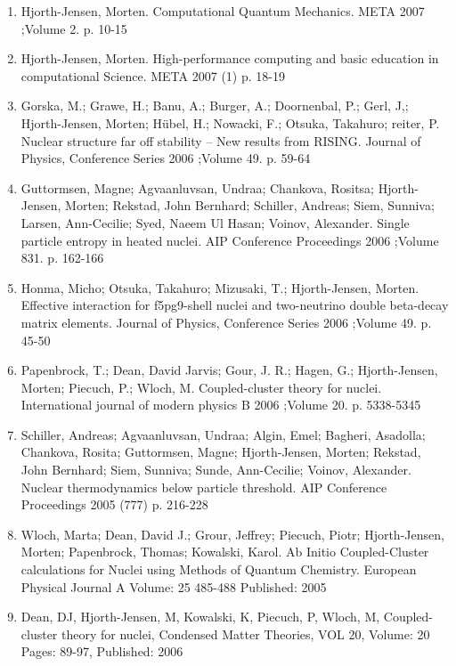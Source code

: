 \documentclass[%
oneside,                 %
final,                   %
10pt]{article}
\begin{document}
\begin{enumerate}
\item Hjorth-Jensen, Morten.  Computational Quantum Mechanics. META 2007 ;Volume 2. p. 10-15

\item Hjorth-Jensen, Morten.  High-performance computing and basic education in computational Science. META 2007 (1) p. 18-19

\item Gorska, M.; Grawe, H.; Banu, A.; Burger, A.; Doornenbal, P.; Gerl, J,; Hjorth-Jensen, Morten; Hübel, H.; Nowacki, F.; Otsuka, Takahuro; reiter, P.  Nuclear structure far off stability – New results from RISING. Journal of Physics, Conference Series 2006 ;Volume 49. p. 59-64

\item Guttormsen, Magne; Agvaanluvsan, Undraa; Chankova, Rositsa; Hjorth-Jensen, Morten; Rekstad, John Bernhard; Schiller, Andreas; Siem, Sunniva; Larsen, Ann-Cecilie; Syed, Naeem Ul Hasan; Voinov, Alexander.  Single particle entropy in heated nuclei. AIP Conference Proceedings 2006 ;Volume 831. p. 162-166

\item Honma, Micho; Otsuka, Takahuro; Mizusaki, T.; Hjorth-Jensen, Morten.  Effective interaction for f5pg9-shell nuclei and two-neutrino double beta-decay matrix elements. Journal of Physics, Conference Series 2006 ;Volume 49. p. 45-50

\item Papenbrock, T.; Dean, David Jarvis; Gour, J. R.; Hagen, G.; Hjorth-Jensen, Morten; Piecuch, P.; Wloch, M.  Coupled-cluster theory for nuclei. International journal of modern physics B 2006 ;Volume 20. p. 5338-5345

\item Schiller, Andreas; Agvaanluvsan, Undraa; Algin, Emel; Bagheri, Asadolla; Chankova, Rosita; Guttormsen, Magne; Hjorth-Jensen, Morten; Rekstad, John Bernhard; Siem, Sunniva; Sunde, Ann-Cecilie; Voinov, Alexander.  Nuclear thermodynamics below particle threshold. AIP Conference Proceedings 2005 (777) p. 216-228

\item Wloch, Marta; Dean, David J.; Grour, Jeffrey; Piecuch, Piotr; Hjorth-Jensen, Morten; Papenbrock, Thomas; Kowalski, Karol.  Ab Initio Coupled-Cluster calculations for Nuclei using Methods of Quantum Chemistry. European Physical Journal A  Volume: 25  485-488   Published: 2005

\item Dean, DJ, Hjorth-Jensen, M, Kowalski, K, Piecuch, P, Wloch, M, Coupled-cluster theory for nuclei, Condensed Matter Theories, VOL 20, Volume: 20  Pages: 89-97, Published: 2006


\end{enumerate}
\end{document}
